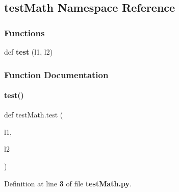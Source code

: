 \subsection{test\+Math Namespace Reference}
\label{namespacetest_math}
\subsubsection*{Functions}
\begin{DoxyCompactItemize}
\item 
def \textbf{ test} (l1, l2)
\end{DoxyCompactItemize}


\subsubsection{Function Documentation}
\mbox{\label{namespacetest_math_aa1a3d4e1c4f74f13640e69f5e9e1ce39}} 
\paragraph{test()}
{\footnotesize\ttfamily def test\+Math.\+test (\begin{DoxyParamCaption}\item[{}]{l1,  }\item[{}]{l2 }\end{DoxyParamCaption})}



Definition at line \textbf{ 3} of file \textbf{ test\+Math.\+py}.

